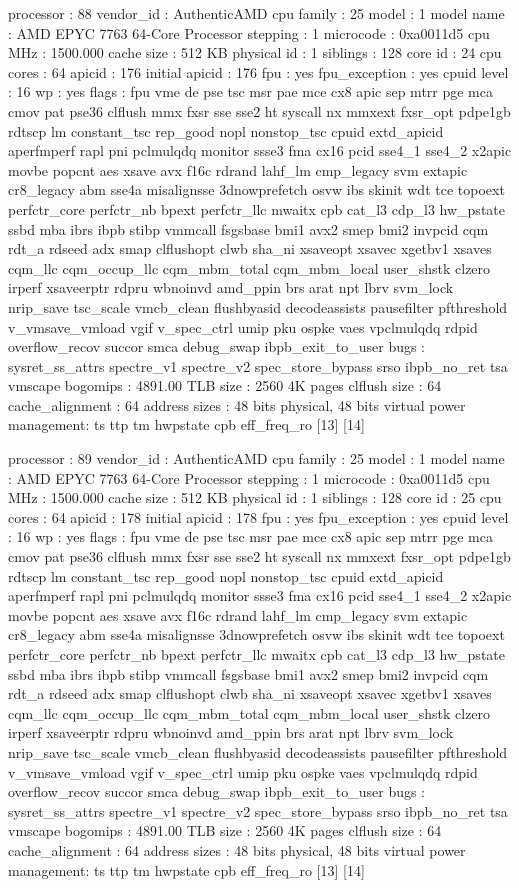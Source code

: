 processor	: 88
vendor_id	: AuthenticAMD
cpu family	: 25
model		: 1
model name	: AMD EPYC 7763 64-Core Processor
stepping	: 1
microcode	: 0xa0011d5
cpu MHz		: 1500.000
cache size	: 512 KB
physical id	: 1
siblings	: 128
core id		: 24
cpu cores	: 64
apicid		: 176
initial apicid	: 176
fpu		: yes
fpu_exception	: yes
cpuid level	: 16
wp		: yes
flags		: fpu vme de pse tsc msr pae mce cx8 apic sep mtrr pge mca cmov pat pse36 clflush mmx fxsr sse sse2 ht syscall nx mmxext fxsr_opt pdpe1gb rdtscp lm constant_tsc rep_good nopl nonstop_tsc cpuid extd_apicid aperfmperf rapl pni pclmulqdq monitor ssse3 fma cx16 pcid sse4_1 sse4_2 x2apic movbe popcnt aes xsave avx f16c rdrand lahf_lm cmp_legacy svm extapic cr8_legacy abm sse4a misalignsse 3dnowprefetch osvw ibs skinit wdt tce topoext perfctr_core perfctr_nb bpext perfctr_llc mwaitx cpb cat_l3 cdp_l3 hw_pstate ssbd mba ibrs ibpb stibp vmmcall fsgsbase bmi1 avx2 smep bmi2 invpcid cqm rdt_a rdseed adx smap clflushopt clwb sha_ni xsaveopt xsavec xgetbv1 xsaves cqm_llc cqm_occup_llc cqm_mbm_total cqm_mbm_local user_shstk clzero irperf xsaveerptr rdpru wbnoinvd amd_ppin brs arat npt lbrv svm_lock nrip_save tsc_scale vmcb_clean flushbyasid decodeassists pausefilter pfthreshold v_vmsave_vmload vgif v_spec_ctrl umip pku ospke vaes vpclmulqdq rdpid overflow_recov succor smca debug_swap ibpb_exit_to_user
bugs		: sysret_ss_attrs spectre_v1 spectre_v2 spec_store_bypass srso ibpb_no_ret tsa vmscape
bogomips	: 4891.00
TLB size	: 2560 4K pages
clflush size	: 64
cache_alignment	: 64
address sizes	: 48 bits physical, 48 bits virtual
power management: ts ttp tm hwpstate cpb eff_freq_ro [13] [14]

processor	: 89
vendor_id	: AuthenticAMD
cpu family	: 25
model		: 1
model name	: AMD EPYC 7763 64-Core Processor
stepping	: 1
microcode	: 0xa0011d5
cpu MHz		: 1500.000
cache size	: 512 KB
physical id	: 1
siblings	: 128
core id		: 25
cpu cores	: 64
apicid		: 178
initial apicid	: 178
fpu		: yes
fpu_exception	: yes
cpuid level	: 16
wp		: yes
flags		: fpu vme de pse tsc msr pae mce cx8 apic sep mtrr pge mca cmov pat pse36 clflush mmx fxsr sse sse2 ht syscall nx mmxext fxsr_opt pdpe1gb rdtscp lm constant_tsc rep_good nopl nonstop_tsc cpuid extd_apicid aperfmperf rapl pni pclmulqdq monitor ssse3 fma cx16 pcid sse4_1 sse4_2 x2apic movbe popcnt aes xsave avx f16c rdrand lahf_lm cmp_legacy svm extapic cr8_legacy abm sse4a misalignsse 3dnowprefetch osvw ibs skinit wdt tce topoext perfctr_core perfctr_nb bpext perfctr_llc mwaitx cpb cat_l3 cdp_l3 hw_pstate ssbd mba ibrs ibpb stibp vmmcall fsgsbase bmi1 avx2 smep bmi2 invpcid cqm rdt_a rdseed adx smap clflushopt clwb sha_ni xsaveopt xsavec xgetbv1 xsaves cqm_llc cqm_occup_llc cqm_mbm_total cqm_mbm_local user_shstk clzero irperf xsaveerptr rdpru wbnoinvd amd_ppin brs arat npt lbrv svm_lock nrip_save tsc_scale vmcb_clean flushbyasid decodeassists pausefilter pfthreshold v_vmsave_vmload vgif v_spec_ctrl umip pku ospke vaes vpclmulqdq rdpid overflow_recov succor smca debug_swap ibpb_exit_to_user
bugs		: sysret_ss_attrs spectre_v1 spectre_v2 spec_store_bypass srso ibpb_no_ret tsa vmscape
bogomips	: 4891.00
TLB size	: 2560 4K pages
clflush size	: 64
cache_alignment	: 64
address sizes	: 48 bits physical, 48 bits virtual
power management: ts ttp tm hwpstate cpb eff_freq_ro [13] [14]

